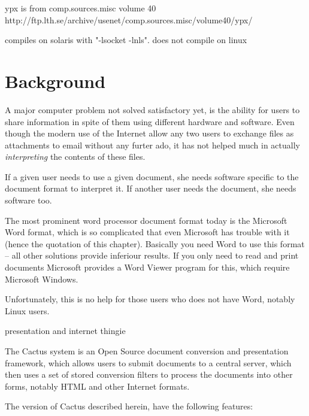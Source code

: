 













ypx is from comp.sources.misc volume 40
http://ftp.lth.se/archive/usenet/comp.sources.misc/volume40/ypx/

compiles on solaris with "-lsocket -lnls".  does not compile on linux



\section{Background}

A major computer problem not solved satisfactory yet, is the ability
for users to share information in spite of them using different
hardware and software.   Even though the modern use of the Internet
allow any two users to exchange files as attachments to
email
without any furter ado, it has not helped much in actually \textit{interpreting} the
contents of these files.

If a given user needs to use a given document, she needs software
specific to the document format to interpret it.  If another user
needs the document, she needs software too.

The most prominent word processor document format today is the
Microsoft Word format, which is so complicated that even Microsoft has
trouble with it (hence the quotation of this chapter).  Basically you
need Word to use this format -- all other solutions provide inferiour
results.  If you only need to read and print documents Microsoft
provides a Word Viewer program for this, which require Microsoft
Windows.

Unfortunately, this is no help for those users who does not have Word,
notably Linux users.

\textsf{presentation and internet thingie}




The Cactus system is an Open Source document conversion and
presentation framework, which allows users to submit documents to a
central server, which then uses a set of stored conversion filters to
process the documents into other forms, notably HTML and other
Internet formats.

The version of Cactus described herein, have the following features:

